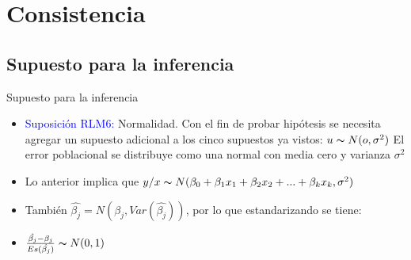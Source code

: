 \section{Consistencia}

\subsection{Supuesto para la inferencia}
\begin{frame}{Supuesto para la inferencia}
	\begin{itemize}
		\item \textcolor{blue}{Suposición RLM6:} Normalidad. Con el fin de probar hipótesis se necesita agregar un supuesto adicional a los cinco supuestos ya vistos: $u \thicksim N(o,\sigma^2)$ El error poblacional se distribuye como una normal con media cero y varianza $\sigma^2$
		\item Lo anterior implica que $y/x \thicksim N(\beta_{0}+\beta_{1}x_{1}+\beta_{2}x_{2}+...+\beta_{k}x_{k},\sigma^2)$
		\item También $\hat{\beta_{j}}=N(\beta_{j},Var(\hat{\beta_{j}}))$, por lo que estandarizando se tiene:
		\item $\frac{\hat{\beta_{j}}-\beta_{j}}{Es(\hat{\beta_{j}})} \thicksim N(0,1)$
	\end{itemize}
\end{frame}